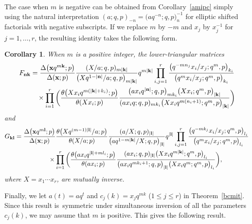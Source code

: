 \documentclass[pdftex]{sigma}%
\numberwithin{equation}{section}
\newtheorem{Corollary}[Theorem]{Corollary}
\newcommand\bn{\mathbf n}
\newcommand\bk{\mathbf k}
\newcommand\bl{\mathbf l}
\newcommand\bx{\mathbf x}
\begin{document}
The case when $m$ is negative can be obtained from
Corollary~\ref{amipc} simply using the natural interpretation
$(a;q,p)_{-n}=\big(aq^{-n};q,p\big)_n^{-1}$ for elliptic shifted factorials with negative subscripts. If we replace $m$ by $-m$ and $x_j$ by $x_j^{-1}$ for $j=1,\dots,r$, the resulting identity takes the following form.

\begin{Corollary}\label{aminc}
When $m$ is a positive integer, the
lower-triangular matrices
\begin{gather*}
F_{\bf nk}=\frac{\Delta\big(\bx q^{m\bk};p\big)}{\Delta(\bx;p)}\frac{(X/a;q,p)_{m|\bk|}}{\big(Xq^{1-|\bn|}/a;q,p\big)_{m|\bk|}} q^{m|\bk|}
\prod\limits_{i,j=1}^r\frac{\big(q^{-mn_j}x_i/x_j;q^m,p\big)_{k_i}}{\big(q^mx_i/x_j;q^m,p\big)_{k_i}}
\\ \phantom{F_{\bf nk}=}{}
\times
\prod\limits_{i=1}^r\bigg(\frac{\theta\big(Xx_iq^{m(|\bk|+k_i)};p\big)}{\theta(Xx_i;p)}
\frac{\big(ax_iq^{|\bn|};q,p\big)_{mk_i}\big(Xx_i;q^m,p\big)_{|\bk|}}{(ax_iq;q,p)_{mk_i}
\big(Xx_iq^{m(n_i+1)};q^m,p\big)_{|\bk|}}\bigg)
\end{gather*}
and
\begin{gather*}
G_{\bf kl}=\frac{\Delta\big(\bx q^{m\bl};p\big)}{\Delta(\bx;p)}\frac{\theta \big(Xq^{(m-1)|\bl|}/a;p\big)}{\theta(X/a;p)}\frac{(a/X;q,p)_{|\bl|}}
{\big(aq^{1-m|\bk|}/X;q,p\big)_{|\bl|}} q^{|\bl|}\prod\limits_{i,j=1}^r
\frac{\big(q^{-mk_j}x_i/x_j;q^m,p\big)_{l_i}}{\big(q^mx_i/x_j;q^m,p\big)_{l_i}}
\\ \phantom{G_{\bf kl}=}{}
\times
\prod\limits_{i=1}^r\bigg(\frac{\theta\big(ax_iq^{|\bl|+ml_i};p\big)}{\theta(ax_i;p)}
\frac{(ax_i;q,p)_{|\bl|}\big(Xx_iq^{m|\bk|};q^m,p\big)_{l_i}}{\big(ax_iq^{mk_i+1};q,p\big)_{|\bl|}
\big(Xx_iq^m;q^m,p\big)_{l_i}}\bigg),
\end{gather*}
where $X=x_1\dotsm x_r$, are mutually inverse.
\end{Corollary}

Finally, we let
$a(t)=aq^t$ and $c_j(k)=x_jq^{mk}$ ($1\leq j\leq r$) in Theorem~\ref{bcmit}.
Since this result is~symmetric under simultaneous inversion of all the parameters $c_j(k)$, we may assume that $m$ is positive. This gives the following result.
\end{document}
